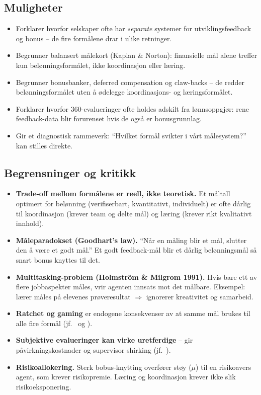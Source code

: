 \subsection*{Muligheter}
\begin{itemize}
\item Forklarer hvorfor selskaper ofte har \emph{separate} systemer for utviklingsfeedback og bonus -- de fire formålene drar i ulike retninger.
\item Begrunner balansert målekort (Kaplan \& Norton): finansielle mål alene treffer kun belønningsformålet, ikke koordinasjon eller læring.
\item Begrunner bonusbanker, deferred compensation og claw-backs -- de redder belønningsformålet uten å ødelegge koordinasjons- og læringsformålet.
\item Forklarer hvorfor 360-evalueringer ofte holdes adskilt fra lønnsoppgjør: rene feedback-data blir forurenset hvis de også er bonusgrunnlag.
\item Gir et diagnostisk rammeverk: ``Hvilket formål svikter i vårt målesystem?'' kan stilles direkte.
\end{itemize}

\subsection*{Begrensninger og kritikk}
\begin{itemize}
\item \textbf{Trade-off mellom formålene er reell, ikke teoretisk.} Et måltall optimert for belønning (verifiserbart, kvantitativt, individuelt) er ofte dårlig til koordinasjon (krever team og delte mål) og læring (krever rikt kvalitativt innhold).
\item \textbf{Måleparadokset (Goodhart's law).} ``Når en måling blir et mål, slutter den å være et godt mål.'' Et godt feedback-mål blir et dårlig belønningsmål så snart bonus knyttes til det.
\item \textbf{Multitasking-problem (Holmström \& Milgrom 1991).} Hvis bare ett av flere jobbaspekter måles, vrir agenten innsats mot det målbare. Eksempel: lærer måles på elevenes prøveresultat $\Rightarrow$ ignorerer kreativitet og samarbeid.
\item \textbf{Ratchet og gaming} er endogene konsekvenser av at samme mål brukes til alle fire formål (jf.\  og ).
\item \textbf{Subjektive evalueringer kan virke uretferdige} -- gir påvirkningskostnader og supervisor shirking (jf.\ ).
\item \textbf{Risikoallokering.} Sterk bobus-knytting overfører støy ($\mu$) til en risikoavers agent, som krever risikopremie. Læring og koordinasjon krever ikke slik risikoeksponering.
\end{itemize}

